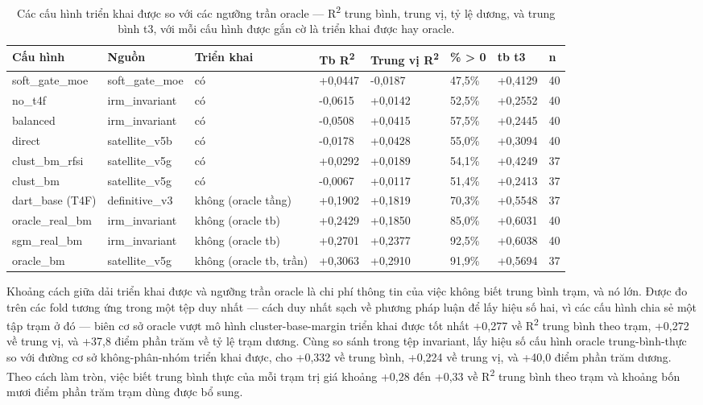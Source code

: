 {\small
\begin{longtable}{llllllll}
\caption{Các cấu hình triển khai được so với các ngưỡng trần oracle --- R\textsuperscript{2} trung bình, trung vị, tỷ lệ dương, và trung bình t3, với mỗi cấu hình được gắn cờ là triển khai được hay oracle.}\\
\toprule
\textbf{Cấu hình} & \textbf{Nguồn} & \textbf{Triển khai} & \textbf{Tb R\textsuperscript{2}} & \textbf{Trung vị R\textsuperscript{2}} & \textbf{\% > 0} & \textbf{tb t3} & \textbf{n} \\
\midrule\endhead
soft\_gate\_moe & soft\_gate\_moe & có & +0,0447 & -0,0187 & 47,5\% & +0,4129 & 40 \\
no\_t4f & irm\_invariant & có & -0,0615 & +0,0142 & 52,5\% & +0,2552 & 40 \\
balanced & irm\_invariant & có & -0,0508 & +0,0415 & 57,5\% & +0,2445 & 40 \\
direct & satellite\_v5b & có & -0,0178 & +0,0428 & 55,0\% & +0,3094 & 40 \\
clust\_bm\_rfsi & satellite\_v5g & có & +0,0292 & +0,0189 & 54,1\% & +0,4249 & 37 \\
clust\_bm & satellite\_v5g & có & -0,0067 & +0,0117 & 51,4\% & +0,2413 & 37 \\
dart\_base (T4F) & definitive\_v3 & không (oracle tầng) & +0,1902 & +0,1819 & 70,3\% & +0,5548 & 37 \\
oracle\_real\_bm & irm\_invariant & không (oracle tb) & +0,2429 & +0,1850 & 85,0\% & +0,6031 & 40 \\
sgm\_real\_bm & irm\_invariant & không (oracle tb) & +0,2701 & +0,2377 & 92,5\% & +0,6038 & 40 \\
oracle\_bm & satellite\_v5g & không (oracle tb, trần) & +0,3063 & +0,2910 & 91,9\% & +0,5694 & 37 \\
\bottomrule
\end{longtable}
}


Khoảng cách giữa dải triển khai được và ngưỡng trần oracle là chi phí thông tin của việc không biết trung bình trạm, và nó lớn. Được đo trên các fold tương ứng trong một tệp duy nhất --- cách duy nhất sạch về phương pháp luận để lấy hiệu số hai, vì các cấu hình chia sẻ một tập trạm ở đó --- biên cơ sở oracle vượt mô hình cluster-base-margin triển khai được tốt nhất +0,277 về R\textsuperscript{2} trung bình theo trạm, +0,272 về trung vị, và +37,8 điểm phần trăm về tỷ lệ trạm dương. Cùng so sánh trong tệp invariant, lấy hiệu số cấu hình oracle trung-bình-thực so với đường cơ sở không-phân-nhóm triển khai được, cho +0,332 về trung bình, +0,224 về trung vị, và +40,0 điểm phần trăm dương. Theo cách làm tròn, việc biết trung bình thực của mỗi trạm trị giá khoảng +0,28 đến +0,33 về R\textsuperscript{2} trung bình theo trạm và khoảng bốn mươi điểm phần trăm trạm dùng được bổ sung.

